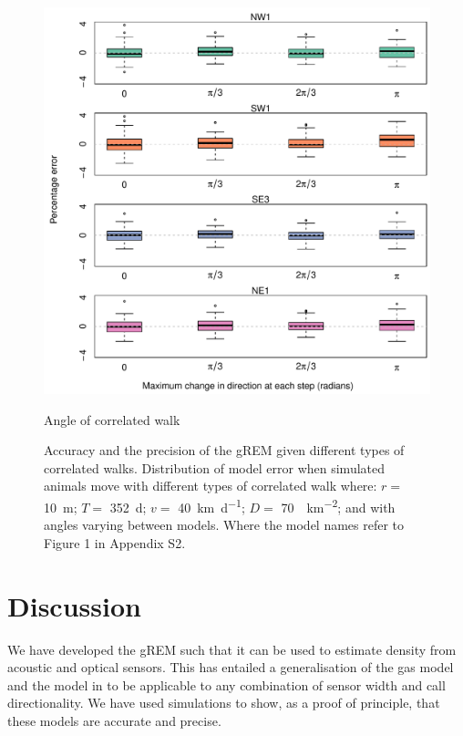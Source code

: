 \documentclass[a4paper,10pt,reqno,oneside]{amsart}
\begin{document}
\begin{figure}[t]
                \centering
		\includegraphics[width=1\textwidth]{imgs/ResultsTort.pdf}
                \caption{Angle of correlated walk}
                \label{f:Tort}
	\caption{Accuracy and the precision of the gREM given different types of correlated walks. Distribution of model error when simulated animals move with different types of correlated walk where:  $r = $ \SI{10}{\meter}; $T = $ \SI{352}{\day}; $v = $ \SI{40}{\kilo\meter\per\day}; $D = $ \SI{70}{\animals\per\kilo\meter\squared}; and with angles varying between models. Where the model names refer to Figure 1 in Appendix S2.} 
\end{figure}

                  
                  
\section{Discussion}


We have developed the gREM such that it can be used to estimate density from acoustic and optical sensors. This has entailed a generalisation of the gas model and the model in \citep{rowcliffe2008estimating} to be applicable to any combination of sensor width and call directionality. We have used simulations to show, as a proof of principle, that these models are accurate and precise.
\end{document}
